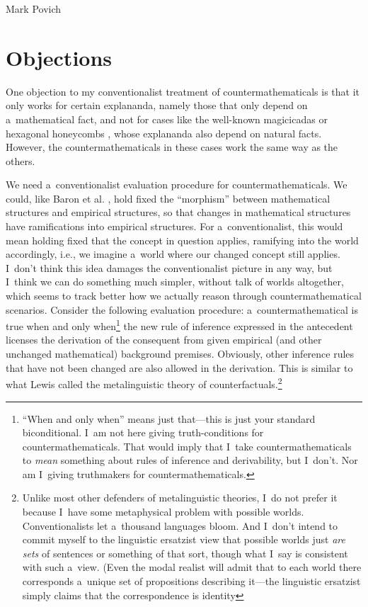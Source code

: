 \begin{artengenv}{Mark Povich}
\section{Objections }
One objection to my conventionalist treatment of countermathematicals is that it only works for certain explananda, namely those that only depend on a~mathematical fact, and not for cases like the well-known magicicadas or hexagonal honeycombs
\parencite[][]{lyon_explanatory_2007}, %
 whose explananda also depend on natural facts. However, the countermathematicals in these cases work the same way as the others.

We need a~conventionalist evaluation procedure for countermathematicals. We could, like Baron et al.
\parencite*[][]{balaguer_mathematical_2017}, %
 hold fixed the ``morphism'' between mathematical structures and empirical structures, so that changes in mathematical structures have ramifications into empirical structures. For a~conventionalist, this would mean holding fixed that the concept in question applies, ramifying into the world accordingly, i.e., we imagine a~world where our changed concept still applies. I~don't think this idea damages the conventionalist picture in any way, but I~think we can do something much simpler, without talk of worlds altogether, which seems to track better how we actually reason through countermathematical scenarios. Consider the following evaluation procedure: a~countermathematical is true when and only when\footnote{``When and only when'' means just that---this is just your standard biconditional. I~am not here giving truth-conditions for countermathematicals. That would imply that I~take countermathematicals to \textit{mean} something about rules of inference and derivability, but I~don't. Nor am I~giving truthmakers for countermathematicals.} the new rule of inference expressed in the antecedent licenses the derivation of the consequent from given empirical (and other unchanged mathematical) background premises. Obviously, other inference rules that have not been changed are also allowed in the derivation. This is similar to what Lewis 
\parencite*[][]{lewis_counterfactuals_1973} %
 called the metalinguistic theory of counterfactuals.\footnote{Unlike most other defenders of metalinguistic theories, I~do not prefer it because I~have some metaphysical problem with possible worlds. Conventionalists let a~thousand languages bloom. And I~don't intend to commit myself to the linguistic ersatzist view that possible worlds just \textit{are sets} of sentences or something of that sort, though what I~say is consistent with such a~view. (Even the modal realist will admit that to each world there corresponds a~unique set of propositions describing it---the linguistic ersatzist simply claims that the correspondence is identity 
}
\end{artengenv}
